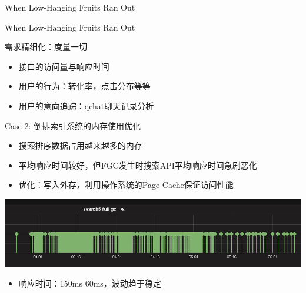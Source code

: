 \documentclass{beamer}
\begin{document}
\begin{CJK}{UTF8}{gbsn}
\begin{frame}{When Low-Hanging Fruits Ran Out}
  \begin{center}
    \plotNumProductGrowthChart[scale=0.7]
  \end{center}
\end{frame}

\begin{frame}{When Low-Hanging Fruits Ran Out}
  \begin{center}
    \plotGMVGrowthChart[scale=0.7]
  \end{center}
\end{frame}

\begin{frame}{需求精细化：度量一切}
  \begin{itemize}
  \item { 接口的访问量与响应时间 }
  \item { 用户的行为：转化率，点击分布等等 }
  \item { 用户的意向追踪：qchat聊天记录分析 }
  \end{itemize}
\end{frame}

\begin{frame}{Case 2: 倒排索引系统的内存使用优化}
  \begin{itemize}
    \item {搜索排序数据占用越来越多的内存}
    \item {平均响应时间较好，但FGC发生时搜索API平均响应时间急剧恶化}
    \item {优化：写入外存，利用操作系统的Page Cache保证访问性能}
  \end{itemize}
  \begin{center}
    \includegraphics[scale=0.3]{./images/searchengine-fullgc}
  \end{center}
  \begin{itemize}
  \item {响应时间：150ms  60ms，波动趋于稳定}
  \end{itemize}
\end{frame}


\end{CJK}
\end{document}
